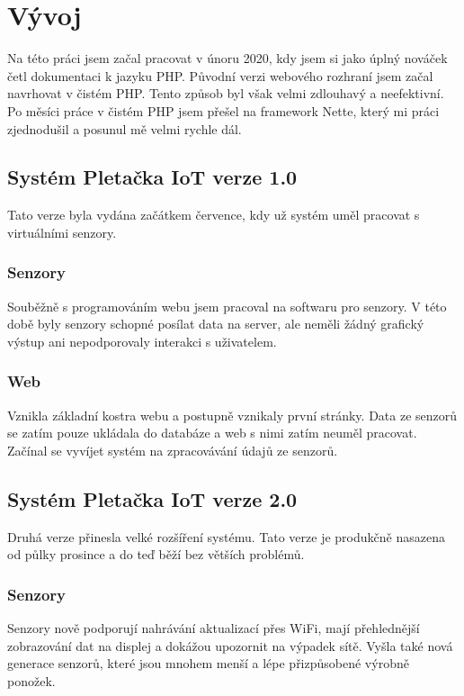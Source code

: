 \chapter{Vývoj}
Na této práci jsem začal pracovat v únoru 2020, kdy jsem si jako úplný nováček četl dokumentaci k jazyku PHP. 
Původní verzi webového rozhraní jsem začal navrhovat v čistém PHP. Tento způsob byl však velmi zdlouhavý a neefektivní.
Po měsíci práce v čistém PHP jsem přešel na framework Nette, který mi práci zjednodušil a posunul mě velmi rychle dál. 


\section{Systém Pletačka IoT verze 1.0}
Tato verze byla vydána začátkem července, kdy už systém uměl pracovat s virtuálními senzory.


\subsection{Senzory}
Souběžně s programováním webu jsem pracoval na softwaru pro senzory.
V této době byly senzory schopné posílat data na server, ale neměli žádný grafický výstup ani nepodporovaly interakci s uživatelem.

\subsection{Web}
Vznikla základní kostra webu a postupně vznikaly první stránky.
Data ze senzorů se zatím pouze ukládala do databáze a web s nimi zatím neuměl pracovat.
Začínal se vyvíjet systém na zpracovávání údajů ze senzorů.



\section{Systém Pletačka IoT verze 2.0}
Druhá verze přinesla velké rozšíření systému.
Tato verze je produkčně nasazena od půlky prosince a do teď běží bez větších problémů.


\subsection{Senzory}
Senzory nově podporují nahrávání aktualizací přes WiFi, mají přehlednější zobrazování dat na displej a dokážou upozornit na výpadek sítě.
Vyšla také nová generace senzorů, které jsou mnohem menší a lépe přizpůsobené výrobně ponožek.


